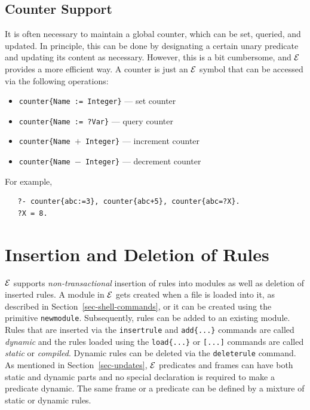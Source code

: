 \documentclass[11pt]{article}
\newcommand{\ERGO}{\mbox{\ensuremath{\cal{E}}\smaller{{\sc{RGO}}}}\xspace}
\newcommand{\FLSYSTEM}{\ERGO}
\begin{document}



\subsection{Counter Support}

It is often necessary to maintain a global counter, which can be set,
queried, and updated. In principle, this can be done
by designating a certain unary predicate and updating its content as necessary.
However, this is a bit cumbersome, and \FLSYSTEM provides a more efficient
way. A counter is just an \FLSYSTEM symbol that can be accessed via the
following operations:

\begin{itemize}
\item \texttt{counter\{Name := Integer\}} --- set counter
\item \texttt{counter\{Name := ?Var\}} --- query counter
\item \texttt{counter\{Name $+$ Integer\}} --- increment counter
\item \texttt{counter\{Name $-$ Integer\}} --- decrement counter
\end{itemize}
For example,
\begin{verbatim}
   ?- counter{abc:=3}, counter{abc+5}, counter{abc=?X}.
   ?X = 8.
\end{verbatim}



\section{Insertion and Deletion of Rules}
\label{sec-rule-update}

\FLSYSTEM supports \emph{non-transactional} insertion of rules into modules as
well as deletion of inserted rules.  A module in \FLSYSTEM gets created when a
file is loaded into it, as described in
Section~\ref{sec-shell-commands}, or it can be created using the primitive
{\tt newmodule}. Subsequently, rules can be added to an existing module.
Rules that are inserted via the {\tt insertrule} and {\tt add\{...\}} commands
are called \emph{dynamic} and the rules loaded using the {\tt load\{...\}} or
{\tt [...]} commands are called \emph{static} or \emph{compiled}.  Dynamic
rules can be deleted via the {\tt deleterule} command. As mentioned in
Section~\ref{sec-updates}, \FLSYSTEM predicates and frames can have both
static and dynamic parts and no special declaration is required to make a
predicate dynamic. The same frame or a predicate can be defined by a
mixture of static or dynamic rules.
\end{document}
